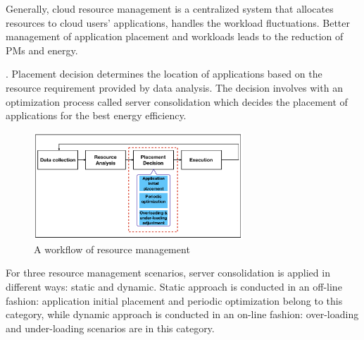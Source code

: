  Generally, cloud resource management is a centralized system \cite{} that allocates resources to cloud users' applications, handles the workload fluctuations. Better management of application placement and workloads leads to the reduction of PMs and energy. 

. Placement decision determines the location of applications based on the resource requirement provided by data analysis. The decision involves with an optimization process called server consolidation which decides the placement of applications for the best energy efficiency. 
\begin{figure}
	\centering
	\includegraphics[width=0.7\textwidth]{pics/workflow_management.png}
	\caption{A workflow of resource management \cite{Mishra:2012kx}}
	\label{fig:workflow}
\end{figure}



 For three resource management scenarios, server consolidation is applied in different ways: static and dynamic. Static approach is conducted in an off-line fashion: application initial placement and periodic optimization belong to this category, while dynamic approach is conducted in an on-line fashion: over-loading and under-loading scenarios are in this category.


